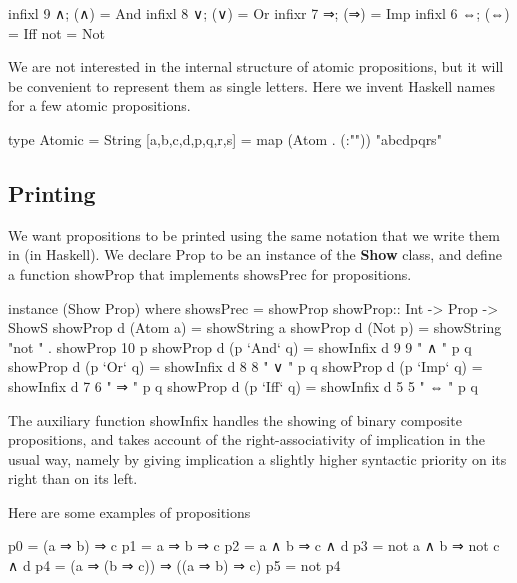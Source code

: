 \documentclass[11pt]{article}
\begin{document}
\begin{code}[]
  infixl 9 ∧;  (∧)  = And
  infixl 8 ∨;  (∨)  = Or
  infixr 7 ⇒; (⇒)  = Imp
  infixl 6 ⇔; (⇔)  = Iff  
  not = Not
\end{code}

We are not interested in the internal structure of atomic
propositions, but it will be convenient to represent
them as single letters. Here we invent Haskell names for a few atomic
propositions.
\begin{code}
  type Atomic = String
  [a,b,c,d,p,q,r,s] = map (Atom . (:"")) "abcdpqrs"
\end{code}


\subsection{Printing}
We want propositions to be printed using the same notation
that we write them in (in Haskell). We declare \textsf{Prop}
to be an instance of the \textbf{Show} class, and define a
function \textsf{showProp} that implements
\textsf{showsPrec} for propositions.

\begin{code}[]
  instance (Show Prop) where showsPrec = showProp  
  showProp::  Int -> Prop -> ShowS
  showProp d (Atom a)    = showString a
  showProp d (Not  p)    = showString "not " . showProp 10 p
  showProp d (p `And` q) = showInfix d 9 9 " ∧ "     p q
  showProp d (p `Or` q)  = showInfix d 8 8 " ∨ "     p q
  showProp d (p `Imp` q) = showInfix d 7 6 " ⇒ "    p q
  showProp d (p `Iff` q) = showInfix d 5 5 " ⇔ "    p q
\end{code}

The auxiliary function \textsf{showInfix} handles the
showing of binary composite propositions, and takes account
of the right-associativity of implication in the usual way,
namely by giving implication a slightly higher syntactic
priority on its right than on its left. 


Here are some examples of propositions

\begin{code}[]
  p0 = (a ⇒ b) ⇒ c
  p1 = a ⇒ b ⇒ c
  p2 = a ∧ b ⇒ c ∧ d
  p3 = not a  ∧  b  ⇒  not c  ∧  d
  p4 = (a ⇒ (b ⇒ c)) ⇒ ((a ⇒ b) ⇒ c)
  p5 = not p4
\end{code}
\end{document}
